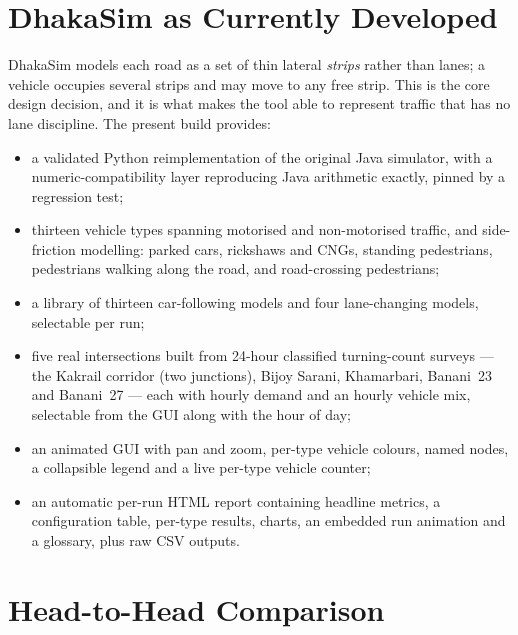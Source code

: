 \documentclass[11pt,a4paper]{article}
\begin{document}
\section{DhakaSim as Currently Developed}
\label{sec:dhakasim}
DhakaSim models each road as a set of thin lateral \emph{strips} rather than lanes; a
vehicle occupies several strips and may move to any free strip. This is the core
design decision, and it is what makes the tool able to represent traffic that has no
lane discipline. The present build provides:

\begin{itemize}
  \item a validated Python reimplementation of the original Java simulator, with a
        numeric-compatibility layer reproducing Java arithmetic exactly, pinned by a
        regression test;
  \item thirteen vehicle types spanning motorised and non-motorised traffic, and
        side-friction modelling: parked cars, rickshaws and CNGs, standing
        pedestrians, pedestrians walking along the road, and road-crossing
        pedestrians;
  \item a library of thirteen car-following models and four lane-changing models,
        selectable per run;
  \item five real intersections built from 24-hour classified turning-count surveys
        --- the Kakrail corridor (two junctions), Bijoy Sarani, Khamarbari, Banani~23
        and Banani~27 --- each with hourly demand and an hourly vehicle mix, selectable
        from the GUI along with the hour of day;
  \item an animated GUI with pan and zoom, per-type vehicle colours, named nodes, a
        collapsible legend and a live per-type vehicle counter;
  \item an automatic per-run HTML report containing headline metrics, a configuration
        table, per-type results, charts, an embedded run animation and a glossary,
        plus raw CSV outputs.
\end{itemize}

\section{Head-to-Head Comparison}
\end{document}
